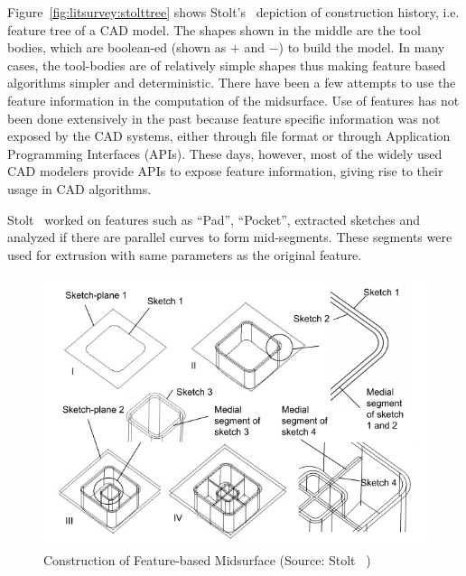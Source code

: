 
Figure~\ref{fig:litsurvey:stolttree} shows Stolt's~\cite{Stolt2006} depiction of construction history, i.e. feature tree of a CAD model. The shapes shown in the middle are the tool bodies, which are boolean-ed (shown as $+$ and $-$) to build the model. In many cases, the tool-bodies are of relatively simple shapes  thus making feature based algorithms simpler and deterministic. There have been a few attempts to use the feature information in the computation of the midsurface. Use of features has not been done extensively in the past because feature specific information was not exposed by the CAD systems, either through file format or through Application Programming Interfaces (APIs). These days, however, most of the widely used CAD modelers provide APIs to expose feature information, giving rise to their usage in CAD algorithms. 


Stolt~\cite{Stolt2005} worked on features such as ``Pad'', ``Pocket'', extracted sketches and analyzed if there are parallel curves to form mid-segments. These segments were used for extrusion with same parameters as the original feature.


	\begin{figure} [!h]
		\centering
		\includegraphics[width=0.75\linewidth]{images/stoltmids}
		\caption{Construction of Feature-based Midsurface (Source: Stolt~\cite{Stolt2006} )}
		\label{fig:litsurvey:stoltmids}
	\end{figure}

